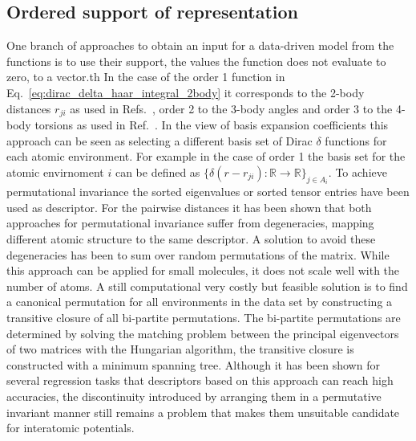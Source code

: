 \subsection{Ordered support of representation}
One branch of approaches to obtain an input for a data-driven model from the functions is to use their support, the values the function does not evaluate to zero, to a vector.th
In the case of the order 1 function in Eq.~\eqref{eq:dirac_delta_haar_integral_2body} it corresponds to the 2-body distances $r_{ji}$ as used in Refs.~\cite{rupp2012fast, montavon2012learning, montavon2013machine, sadeghi2013metrics}, order 2 to the 3-body angles and order 3 to the 4-body torsions as used in Ref.~\cite{huang2016communication}.
In the view of basis expansion coefficients this approach can be seen as selecting a different basis set of Dirac $\delta$ functions for each atomic environment.
For example in the case of order 1 the basis set for the atomic envirnoment $i$ can be defined as $\{\delta(r-r_{ji}):\mathbb{R}\rightarrow\mathbb{R}\}_{j\in A_i}$.
To achieve permutational invariance the sorted eigenvalues\cite{rupp2012fast, sadeghi2013metrics, zhu2016fingerprint} or sorted tensor entries\cite{hansen2015machine, barker2016localized, huang2016communication} have been used as descriptor.
For the pairwise distances it has been shown that both approaches for permutational invariance suffer from degeneracies, mapping different atomic structure to the same descriptor\cite{moussa2012comment}.
A solution to avoid these degeneracies has been to sum over random permutations of the matrix\cite{montavon2012learning, montavon2013machine, sadeghi2013metrics}.
While this approach can be applied for small molecules, it does not scale well with the number of atoms.
A still computational very costly but feasible solution is to find a canonical permutation for all environments in the data set by constructing a transitive closure of all bi-partite permutations\cite{chmiela2018towards}. The bi-partite permutations are determined by solving the matching problem between the principal eigenvectors of two matrices with the Hungarian algorithm\cite{kuhn1955hungarian}, the transitive closure is constructed with a minimum spanning tree.
Although it has been shown for several regression tasks that descriptors based on this approach can reach high accuracies\cite{barker2016localized,huang2016communication}, the discontinuity introduced by arranging them in a permutative invariant manner still remains a problem that makes them unsuitable candidate for interatomic potentials.

